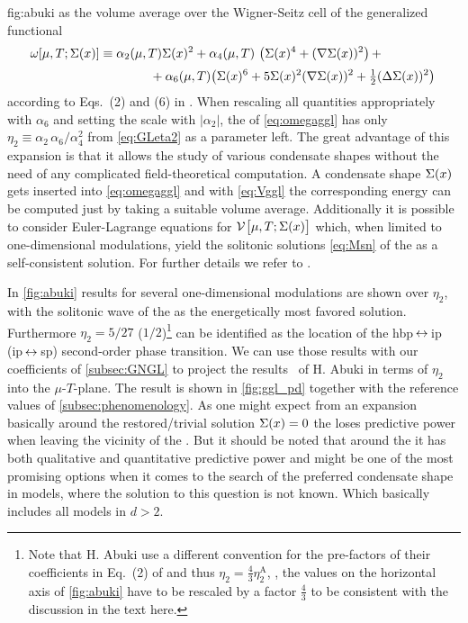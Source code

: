 	{fig:abuki}%
\clearpage
as the volume average over the Wigner-Seitz cell of the generalized \gl{} functional
\begin{align}
\omega[\muT;\smin (\ex )]&\equiv \alpha_2(\muT) \smin (\ex )^2 +\alpha_4(\muT) \ \big(\smin (\ex )^4 + (\grad \smin (\ex ))^2\big)\,+\notag\\[.2em]
&\qquad\qquad +\alpha_6(\muT) \big(\smin (\ex )^6 + 5\smin (\ex )^2(\grad \smin (\ex ))^2+\tfrac{1}{2}(\Delta \smin (\ex ) )^2\big)\,
\label{eq:omegaggl}
\end{align}
according to Eqs.~(2) and (6) in .
When rescaling all quantities appropriately with $\alpha_6$ and setting the scale with $|\alpha_2|$, the \rhs{} of \cref{eq:omegaggl} has only $\eta_2\equiv \alpha_2 \,\alpha_6/\alpha_4^2$ from \cref{eq:GLeta2} as a parameter left.
The great advantage of this expansion is that it allows the study of various condensate shapes without the need of any complicated field-theoretical computation.
A condensate shape $\Sigma (x )$ gets inserted into \cref{eq:omegaggl} and with \cref{eq:Vggl} the corresponding energy can be computed just by taking a suitable volume average.
Additionally it is possible to consider Euler-Lagrange equations for $\VeffFArgs{\muT;\smin (\ex )}$ which, when limited to one-dimensional modulations, yield the solitonic solutions \eqref{eq:Msn} of the \gnm{} as a self-consistent solution.
For further details we refer to .

In \cref{fig:abuki} results for several one-dimensional modulations are shown over $\eta_2$, with the solitonic wave of the \gnm{} as the energetically most favored solution. 
Furthermore $\eta_2=5/27$ ($1/2$)\footnote{
	Note that H. Abuki \etal{} use a different convention for the pre-factors of their \ggl{} coefficients in Eq.~(2) of  and thus $\eta_2=\frac{4}{3}\eta_2^\mathrm{A}$, \ie{},
	the values on the horizontal axis of \cref{fig:abuki} have to be rescaled by a factor $\frac{4}{3}$ to be consistent with the discussion in the text here.
} can be identified as the location of the \gls{hbp}$\,\leftrightarrow\,$\gls{ip} (\gls{ip}$\,\leftrightarrow\,$\gls{sp}) second-order phase transition.
We can use those results with our \gl{} coefficients of \cref{subsec:GNGL} to project the results~\cite{Abuki:2011pf} of H. Abuki \etal{} in terms of $\eta_2$  into the $\mu$-$T$-plane.
The result is shown in \cref{fig:ggl_pd} together with the reference values of \cref{subsec:phenomenology}.
As one might expect from an expansion basically around the restored/trivial solution $\Sigma (x )=0$ the \ggle{} loses predictive power when leaving the vicinity of the \lp{}.
But it should be noted that around the \lp{} it has both qualitative and quantitative predictive power and might be one of the most promising options when it comes to the search of the preferred condensate shape in models, where the solution to this question is not known. 
Which basically includes all models in $d>2$.

